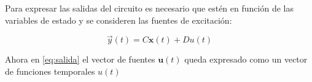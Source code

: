 \documentclass[10pt,a4paper]{article} %
\begin{document}
	Para expresar las salidas del circuito es necesario que estén en función de las variables de estado y se consideren las fuentes de excitación:
	
		\begin{equation}
	\vec{y}(t)=C\textbf{x}(t)+Du(t)\label{eq:salida}
	\end{equation}
	
	Ahora en \ref{eq:salida} el vector de fuentes $\textbf{u}(t)$ queda expresado como un vector de funciones temporales $u(t)$
	
	

	
	
	
\end{document}
